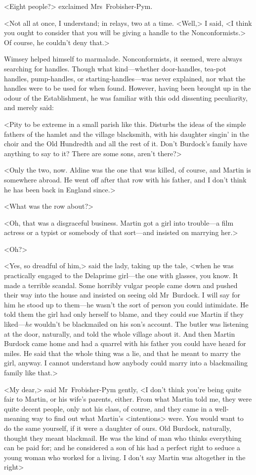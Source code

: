 <Eight people?> exclaimed Mrs~Frobisher-Pym.

<Not all at once, I understand; in relays, two at a time. <Well,> I said, <I think you ought to consider that you will be giving a handle to the Nonconformists.> Of course, he couldn't deny that.>

Wimsey helped himself to marmalade. Nonconformists, it seemed, were always searching for handles. Though what kind—whether door-handles, tea-pot handles, pump-handles, or starting-handles—was never explained, nor what the handles were to be used for when found. However, having been brought up in the odour of the Establishment, he was familiar with this odd dissenting peculiarity, and merely said:

<Pity to be extreme in a small parish like this. Disturbs the ideas of the simple fathers of the hamlet and the village blacksmith, with his daughter singin' in the choir and the Old Hundredth and all the rest of it. Don't Burdock's family have anything to say to it? There are some sons, aren't there?>

<Only the two, now. Aldine was the one that was killed, of course, and Martin is somewhere abroad. He went off after that row with his father, and I don't think he has been back in England since.>

<What was the row about?>

<Oh, that was a disgraceful business. Martin got a girl into trouble—a film actress or a typist or somebody of that sort—and insisted on marrying her.>

<Oh?>

<Yes, so dreadful of him,> said the lady, taking up the tale, <when he was practically engaged to the Delaprime girl—the one with glasses, you know. It made a terrible scandal. Some horribly vulgar people came down and pushed their way into the house and insisted on seeing old Mr~Burdock. I will say for him he stood up to them—he wasn't the sort of person you could intimidate. He told them the girl had only herself to blame, and they could sue Martin if they liked—\textit{he} wouldn't be blackmailed on his son's account. The butler was listening at the door, naturally, and told the whole village about it. And then Martin Burdock came home and had a quarrel with his father you could have heard for miles. He said that the whole thing was a lie, and that he meant to marry the girl, anyway. I cannot understand how anybody could marry into a blackmailing family like that.>

<My dear,> said Mr~Frobisher-Pym gently, <I don't think you're being quite fair to Martin, or his wife's parents, either. From what Martin told me, they were quite decent people, only not his class, of course, and they came in a well-meaning way to find out what Martin's <intentions> were. You would want to do the same yourself, if it were a daughter of ours. Old Burdock, naturally, thought they meant blackmail. He was the kind of man who thinks everything can be paid for; and he considered a son of his had a perfect right to seduce a young woman who worked for a living. I don't say Martin was altogether in the right\longdash>

